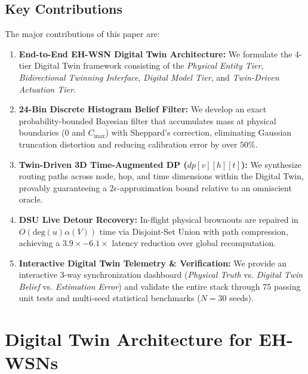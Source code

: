 \documentclass[journal]{IEEEtran}
\begin{document}
\subsection{Key Contributions}
The major contributions of this paper are:
\begin{enumerate}
    \item \textbf{End-to-End EH-WSN Digital Twin Architecture:} We formulate the 4-tier Digital Twin framework consisting of the \textit{Physical Entity Tier}, \textit{Bidirectional Twinning Interface}, \textit{Digital Model Tier}, and \textit{Twin-Driven Actuation Tier}.
    \item \textbf{24-Bin Discrete Histogram Belief Filter:} We develop an exact probability-bounded Bayesian filter that accumulates mass at physical boundaries ($0$ and $C_{\text{max}}$) with Sheppard's correction, eliminating Gaussian truncation distortion and reducing calibration error by over $50\%$.
    \item \textbf{Twin-Driven 3D Time-Augmented DP ($dp[v][h][t]$):} We synthesize routing paths across node, hop, and time dimensions within the Digital Twin, provably guaranteeing a $2\epsilon$-approximation bound relative to an omniscient oracle.
    \item \textbf{DSU Live Detour Recovery:} In-flight physical brownouts are repaired in $O(\text{deg}(u)\alpha(V))$ time via Disjoint-Set Union with path compression, achieving a $3.9\times - 6.1\times$ latency reduction over global recomputation.
    \item \textbf{Interactive Digital Twin Telemetry & Verification:} We provide an interactive 3-way synchronization dashboard (\textit{Physical Truth} vs. \textit{Digital Twin Belief} vs. \textit{Estimation Error}) and validate the entire stack through 75 passing unit tests and multi-seed statistical benchmarks ($N=30$ seeds).
\end{enumerate}

\section{Digital Twin Architecture for EH-WSNs}
\end{document}
